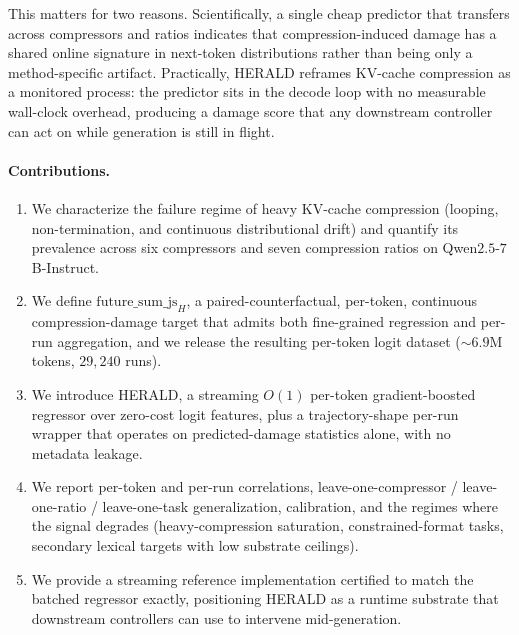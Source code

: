 \documentclass[11pt,a4paper]{article}
\begin{document}
This matters for two reasons. Scientifically, a single cheap predictor that transfers across compressors and ratios indicates that compression-induced damage has a shared online signature in next-token distributions rather than being only a method-specific artifact. Practically, HERALD reframes KV-cache compression as a monitored process: the predictor sits in the decode loop with no measurable wall-clock overhead, producing a damage score that any downstream controller can act on while generation is still in flight.

\paragraph{Contributions.}
\begin{enumerate}[leftmargin=*,itemsep=2pt,topsep=2pt]
  \item We characterize the failure regime of heavy KV-cache compression (looping, non-termination, and continuous distributional drift) and quantify its prevalence across six compressors and seven compression ratios on Qwen$2.5$-$7$B-Instruct.
  \item We define $\text{future\_sum\_js}_H$, a paired-counterfactual, per-token, continuous compression-damage target that admits both fine-grained regression and per-run aggregation, and we release the resulting per-token logit dataset ($\sim 6.9$M tokens, $29{,}240$ runs).
  \item We introduce HERALD, a streaming $O(1)$ per-token gradient-boosted regressor over zero-cost logit features, plus a trajectory-shape per-run wrapper that operates on predicted-damage statistics alone, with no metadata leakage.
  \item We report per-token and per-run correlations, leave-one-compressor / leave-one-ratio / leave-one-task generalization, calibration, and the regimes where the signal degrades (heavy-compression saturation, constrained-format tasks, secondary lexical targets with low substrate ceilings).
  \item We provide a streaming reference implementation certified to match the batched regressor exactly, positioning HERALD as a runtime substrate that downstream controllers can use to intervene mid-generation.
\end{enumerate}

\end{document}
